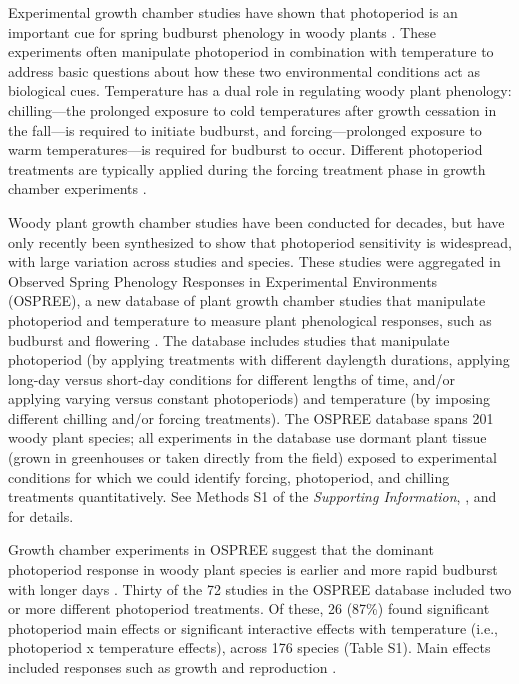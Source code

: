 \documentclass{article}
\begin{document}
\par Experimental growth chamber studies have shown that photoperiod is an important cue for spring budburst phenology in woody plants \citep[e.g.,][]{flynn2018,Basler:2014aa,Heide:1993a}. These experiments often manipulate photoperiod in combination with temperature to address basic questions about how these two environmental conditions act as biological cues. Temperature has a dual role in regulating woody plant phenology: chilling---the prolonged exposure to cold temperatures after growth cessation in the fall---is required to initiate budburst, and forcing---prolonged exposure to warm temperatures---is required for budburst to occur. Different photoperiod treatments are typically applied during the forcing treatment phase in growth chamber experiments \citep[e.g.,][]{Laube:2014a,Spann:2004aa,Falusi:1990aa,HEIDE:1977aa,Campbell:1975aa}. 

\par Woody plant growth chamber studies have been conducted for decades, but have only recently been synthesized to show that photoperiod sensitivity is widespread, with large variation across studies and species. These studies were aggregated in Observed Spring Phenology Responses in Experimental Environments (OSPREE), a new database of plant growth chamber studies that manipulate photoperiod and temperature to measure plant phenological responses, such as budburst and flowering \citep{wolkovich2019}. The database includes studies that manipulate photoperiod (by applying treatments with different daylength durations, applying long-day versus short-day conditions for different lengths of time, and/or applying varying versus constant photoperiods) and temperature (by imposing different chilling and/or forcing treatments). The OSPREE database spans 201 woody plant species; all experiments in the database use dormant plant tissue (grown in greenhouses or taken directly from the field) exposed to experimental conditions for which we could identify forcing, photoperiod, and chilling treatments quantitatively. See Methods S1 of the \emph{Supporting Information}, \citet{ettinger2020}, and \citet{wolkovich2019} for details. 


\par Growth chamber experiments in OSPREE suggest that the dominant photoperiod response in woody plant species is earlier and more rapid budburst with longer days \citep [e.g., ][]{Caffarra:2011a}. Thirty of the 72 studies in the OSPREE database included two or more different photoperiod treatments. Of these, 26 (87\%) found significant photoperiod main effects or significant interactive effects with temperature (i.e., photoperiod x temperature effects), across 176 species (Table S1). Main effects included responses such as growth \citep[e.g., higher growth rates with longer days][]{Ashby:1962aa} and reproduction \citep[e.g., increased flowering with longer days][]{Heide:2012aa}. 
\end{document}
